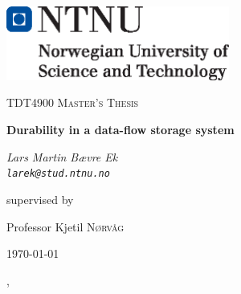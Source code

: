 \documentclass[b5paper]{report}
\begin{document}
\begin{titlepage}
  \centering
	\includegraphics[width=0.55\textwidth]{ntnu}\par\vspace{1cm}
	{\scshape\Large TDT4900 Master's Thesis \par}
	\vspace{1.5cm}
	{\huge\bfseries Durability in a data-flow storage system\par}
	\vspace{2cm}
	{\Large\itshape Lars Martin Bævre Ek \\ \texttt{larek@stud.ntnu.no} \par}
	\vfill
	supervised by\par
  Professor Kjetil \textsc{Nørvåg}

	{\large \today\par}
\end{titlepage}



\tableofcontents
\pagebreak

\begin{abstract}
  
\end{abstract}

\ChTitleVar{\Huge\bfseries\rm}, \ChRuleWidth{1pt}











\appendix


\printbibliography
\end{document}
